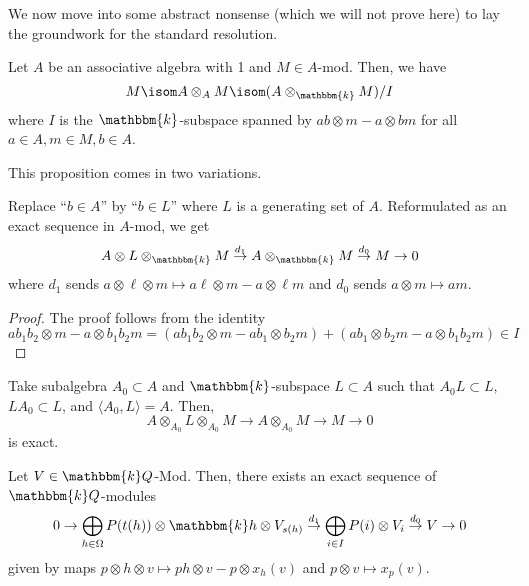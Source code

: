 \documentclass[11pt,leqno,oneside]{amsbook}
\numberwithin{thm}{section}
\newcommand{\bbk}{\mathbbm{k}} %
\renewcommand{\Q}{Q} %
\begin{document}
We now move into some abstract nonsense (which we will not prove here)
to lay the groundwork for the standard resolution.
\begin{prop}
  Let \(A\) be an associative algebra with 1 and \(M \in
  A\)-mod. Then, we have \[
    M \isom A \otimes_A M \isom (A \otimes_{\bbk} M) / I
  \]
  where \(I\) is the \(\bbk\)-subspace spanned by \(ab \otimes m - a
  \otimes bm\) for all \(a \in A, m \in M, b \in A\). 
\end{prop}
This proposition comes in two variations.
\begin{prop}[Variation 1]
  Replace ``\(b \in A\)'' by ``\(b \in L\)'' where \(L\) is a
  generating set of \(A\). Reformulated as an exact sequence in
  \(A\)-mod, we get \[
    A \otimes L \otimes_{\bbk} M \overset{d_1}{\to} A \otimes_{\bbk} M \overset{d_0}{\to} M \to 0
  \]
  where \(d_1\) sends \(a \otimes \ell \otimes m \mapsto a \ell
  \otimes m - a \otimes \ell m\) and \(d_0\) sends \(a \otimes m
  \mapsto am\).
\end{prop}
\begin{proof}
  The proof follows from the identity \[
    a b_1 b_2 \otimes m - a \otimes b_1 b_2 m = (a b_1 b_2 \otimes m -
    a b_1 \otimes b_2 m) + (a b_1 \otimes b_2 m - a \otimes b_1 b_2 m)
    \in I
  \]
\end{proof}
\begin{prop}[Variation 2]
  Take subalgebra \(A_0 \subset A\) and \(\bbk\)-subspace \(L \subset
  A\) such that \(A_0 L \subset L\), \(L A_0 \subset L\), and
  \(\langle A_0, L \rangle = A\). Then, \[
    A \otimes_{A_0} L \otimes_{A_0} M \to A \otimes_{A_0} M \to M \to 0
  \]
  is exact.
\end{prop}
\begin{thm}
  Let \(V \in \bbk \Q\)-Mod. Then, there exists an exact sequence of
  \(\bbk \Q\)-modules \[
    0 \to \bigoplus_{h \in \Omega} P(t(h)) \otimes \bbk h \otimes
    V_{s(h)} \overset{d_1}{\to} \bigoplus_{i \in I} P(i) \otimes V_i \overset{d_0}{\to} V \to 0
  \]
  given by maps \(p \otimes h \otimes v \mapsto ph \otimes v - p
  \otimes x_h(v)\) and \(p \otimes v \mapsto x_p(v)\).
\end{thm}
\end{document}
